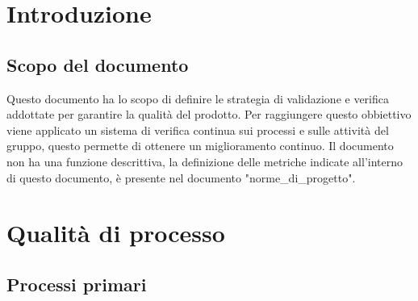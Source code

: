 \documentclass[12pt]{article}
\begin{document}
\section{Introduzione}
\subsection{Scopo del documento}
Questo documento ha lo scopo di definire le strategia di validazione e verifica addottate per garantire la qualità del prodotto.
Per raggiungere questo obbiettivo viene applicato un sistema di verifica continua sui processi e sulle attività del gruppo, questo permette di ottenere un miglioramento continuo.
Il documento non ha una funzione descrittiva, la definizione delle metriche indicate all'interno di questo documento, è presente nel documento "norme\_di\_progetto".
\section{Qualità di processo}

\subsection{Processi primari}
\end{document}
